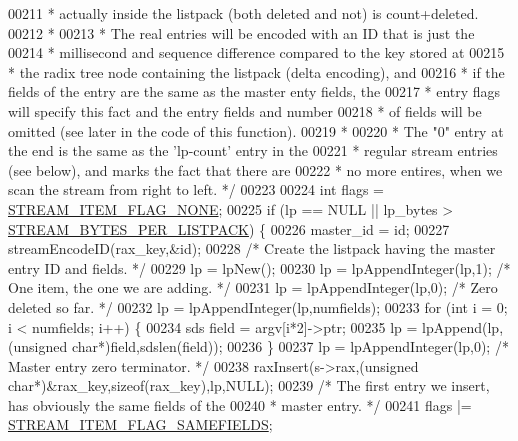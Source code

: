 \begin{DoxyCode}
{00211 \textcolor{comment}{     * actually inside the listpack (both deleted and not) is count+deleted.}
00212 \textcolor{comment}{     *}
00213 \textcolor{comment}{     * The real entries will be encoded with an ID that is just the}
00214 \textcolor{comment}{     * millisecond and sequence difference compared to the key stored at}
00215 \textcolor{comment}{     * the radix tree node containing the listpack (delta encoding), and}
00216 \textcolor{comment}{     * if the fields of the entry are the same as the master enty fields, the}
00217 \textcolor{comment}{     * entry flags will specify this fact and the entry fields and number}
00218 \textcolor{comment}{     * of fields will be omitted (see later in the code of this function).}
00219 \textcolor{comment}{     *}
00220 \textcolor{comment}{     * The "0" entry at the end is the same as the 'lp-count' entry in the}
00221 \textcolor{comment}{     * regular stream entries (see below), and marks the fact that there are}
00222 \textcolor{comment}{     * no more entires, when we scan the stream from right to left. */}
00223 
00224     \textcolor{keywordtype}{int} flags = \hyperlink{t__stream_8c_a984a9c72198b288332d9d3603336efeb}{STREAM\_ITEM\_FLAG\_NONE};
00225     \textcolor{keywordflow}{if} (lp == NULL || lp\_bytes > \hyperlink{t__stream_8c_a9c3553abeeeb8af68091fe9803dcbf95}{STREAM\_BYTES\_PER\_LISTPACK}) \{
00226         master\_id = id;
00227         streamEncodeID(rax\_key,&id);
00228         \textcolor{comment}{/* Create the listpack having the master entry ID and fields. */}
00229         lp = lpNew();
00230         lp = lpAppendInteger(lp,1); \textcolor{comment}{/* One item, the one we are adding. */}
00231         lp = lpAppendInteger(lp,0); \textcolor{comment}{/* Zero deleted so far. */}
00232         lp = lpAppendInteger(lp,numfields);
00233         \textcolor{keywordflow}{for} (\textcolor{keywordtype}{int} i = 0; i < numfields; i++) \{
00234             sds field = argv[i*2]->ptr;
00235             lp = lpAppend(lp,(\textcolor{keywordtype}{unsigned} \textcolor{keywordtype}{char}*)field,sdslen(field));
00236         \}
00237         lp = lpAppendInteger(lp,0); \textcolor{comment}{/* Master entry zero terminator. */}
00238         raxInsert(s->rax,(\textcolor{keywordtype}{unsigned} \textcolor{keywordtype}{char}*)&rax\_key,\textcolor{keyword}{sizeof}(rax\_key),lp,NULL);
00239         \textcolor{comment}{/* The first entry we insert, has obviously the same fields of the}
00240 \textcolor{comment}{         * master entry. */}
00241         flags |= \hyperlink{t__stream_8c_a6977b456a646762a7650d432a06dc6c5}{STREAM\_ITEM\_FLAG\_SAMEFIELDS};
}
\end{DoxyCode}
